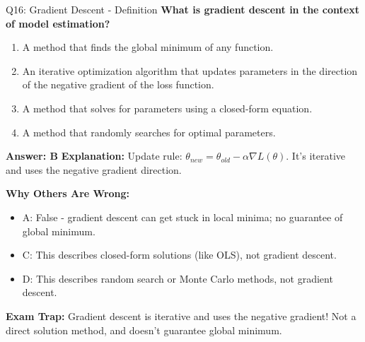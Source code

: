 \documentclass[8pt]{beamer}
\begin{document}
	\begin{frame}{Q16: Gradient Descent - Definition}
		\fontsize{6.5}{7.5}\selectfont
		\textbf{What is gradient descent in the context of model estimation?}
		
		\begin{enumerate}
			\item A method that finds the global minimum of any function.
			\item An iterative optimization algorithm that updates parameters in the direction of the negative gradient of the loss function.
			\item A method that solves for parameters using a closed-form equation.
			\item A method that randomly searches for optimal parameters.
		\end{enumerate}
		
		\vspace{0.05cm}
		\textcolor{myblue}{\textbf{Answer: B}}
		\vspace{0.05cm}
		\textcolor{myblue}{\textbf{Explanation:}} Update rule: $\theta_{new} = \theta_{old} - \alpha \nabla L(\theta)$. It's iterative and uses the negative gradient direction.
		
		\vspace{0.05cm}
		\textcolor{myred}{\textbf{Why Others Are Wrong:}}
		\begin{itemize}
			\item \textcolor{myred}{A:} False - gradient descent can get stuck in local minima; no guarantee of global minimum.
			\item \textcolor{myred}{C:} This describes closed-form solutions (like OLS), not gradient descent.
			\item \textcolor{myred}{D:} This describes random search or Monte Carlo methods, not gradient descent.
		\end{itemize}
		
		\textcolor{myred}{\textbf{Exam Trap:}} Gradient descent is \textcolor{myblue}{iterative} and uses the \textcolor{myblue}{negative gradient}! Not a direct solution method, and doesn't guarantee global minimum.
	\end{frame}
	
\end{document}
